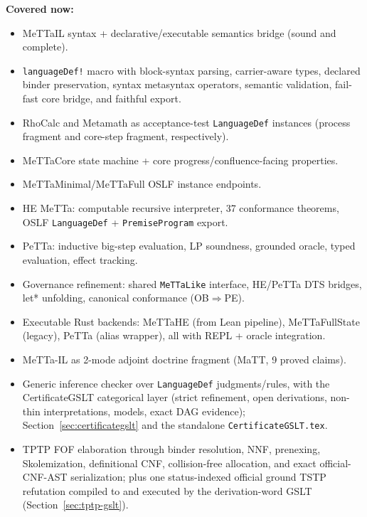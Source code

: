 \documentclass[11pt]{article}
\newcommand{\code}[1]{\texttt{#1}}
\begin{document}
\textbf{Covered now:}
\begin{itemize}
\item MeTTaIL syntax + declarative/executable semantics bridge (sound and complete).
\item \code{languageDef!} macro with block-syntax parsing, carrier-aware types,
  declared binder preservation, syntax metasyntax operators, semantic validation,
  fail-fast core bridge, and faithful export.
\item RhoCalc and Metamath as acceptance-test \code{LanguageDef} instances
  (process fragment and core-step fragment, respectively).
\item MeTTaCore state machine + core progress/confluence-facing properties.
\item MeTTaMinimal/MeTTaFull OSLF instance endpoints.
\item HE MeTTa: computable recursive interpreter, 37 conformance theorems,
  OSLF \code{LanguageDef} + \code{PremiseProgram} export.
\item PeTTa: inductive big-step evaluation, LP soundness, grounded oracle,
  typed evaluation, effect tracking.
\item Governance refinement: shared \code{MeTTaLike} interface, HE/PeTTa
  DTS bridges, let* unfolding, canonical conformance (OB$\Rightarrow$PE).
\item Executable Rust backends: MeTTaHE (from Lean pipeline), MeTTaFullState
  (legacy), PeTTa (alias wrapper), all with REPL + oracle integration.
\item MeTTa-IL as 2-mode adjoint doctrine fragment (MaTT, 9 proved claims).
\item Generic inference checker over \code{LanguageDef} judgments/rules,
  with the CertificateGSLT categorical layer (strict refinement, open derivations,
  non-thin interpretations, models, exact DAG evidence);
  Section~\ref{sec:certificategslt} and the standalone \code{CertificateGSLT.tex}.
\item TPTP FOF elaboration through binder resolution, NNF, prenexing,
  Skolemization, definitional CNF, collision-free allocation, and exact
  official-CNF-AST serialization; plus one status-indexed official ground
  TSTP refutation compiled to and executed by the derivation-word
  GSLT (Section~\ref{sec:tptp-gslt}).
\end{itemize}
\end{document}
